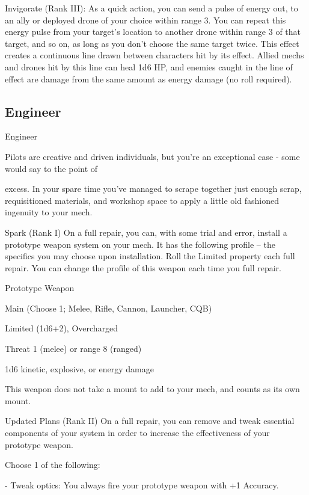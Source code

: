 Invigorate (Rank III): As a quick action, you can send a pulse of energy out, to an ally or  
deployed drone of your choice within range 3. You can repeat this energy pulse from your  
target’s location to another drone within range 3 of that target, and so on, as long as you don’t  
choose the same target twice. This effect creates a continuous line drawn between characters hit  
by its effect. Allied mechs and drones hit by this line can heal 1d6 HP, and enemies caught in the  
line of effect are damage from the same amount as energy damage (no roll required).
 
\subsection{Engineer}

                                                   Engineer  

Pilots are creative and driven individuals, but you’re an exceptional case - some would say to the point of  

excess. In your spare time you’ve managed to scrape together just enough scrap, requisitioned materials,  
and workshop space to apply a little old fashioned ingenuity to your mech.  

Spark (Rank I)  
On a full repair, you can, with some trial and error, install a prototype weapon system on your  
mech. It has the following profile -- the specifics you may choose upon installation. Roll the  
Limited property each full repair. You can change the profile of this weapon each time you full  
repair.
 
         Prototype Weapon
 
         Main (Choose 1; Melee, Rifle, Cannon, Launcher, CQB)
 
         Limited (1d6+2), Overcharged
 
         Threat 1 (melee) or range 8 (ranged)
 
         1d6 kinetic, explosive, or energy damage
 
This weapon does not take a mount to add to your mech, and counts as its own mount.
 
Updated Plans  (Rank II)  
On a full repair, you can remove and tweak essential components of your system in order to  
increase the effectiveness of your prototype weapon.
 
Choose 1 of the following:
 
  - Tweak optics:  
         You always fire your prototype weapon with +1 Accuracy. 
 
